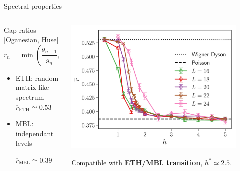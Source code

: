 \begin{frame}{Spectral properties}
\begin{columns}
\begin{column}{0.5\textwidth}
Gap ratios {\footnotesize [Oganesian, Huse]}
\[
	r_n = \min\left(\frac{g_{n+1}}{g_n}, \frac{g_n}{g_{n+1}}\right)
\]
\begin{itemize}
	\item \textcolor{comp}{ETH: random matrix-like spectrum}
	$\overline{r}_\text{ETH} \simeq 0.53$
	\item \textcolor{BostonBlue}{MBL: independant levels}
	
	$\overline{r}_\text{MBL} \simeq 0.39$
\end{itemize}
\end{column}
\begin{column}{0.5\textwidth}
\centering
\includegraphics[width=0.9\textwidth]{img/3_Fibonacci/rgap}

Compatible with \textbf{ETH/MBL transition}, $h^* \simeq 2.5$.
\end{column}
\end{columns}
\end{frame}
